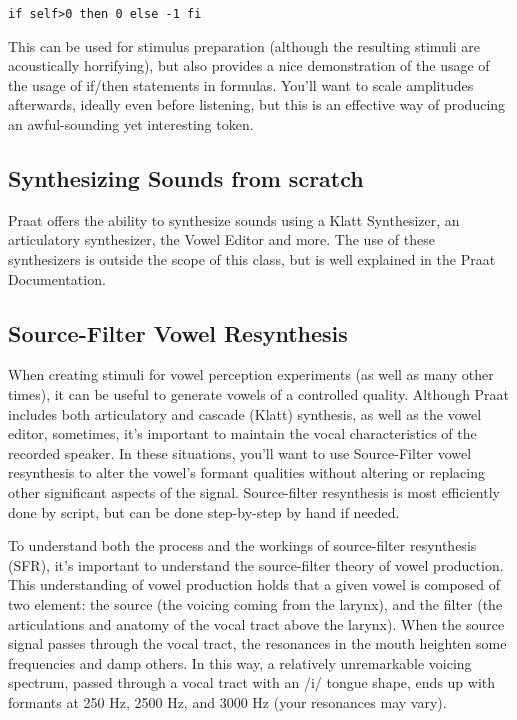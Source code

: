 \documentclass[11pt]{article}
\begin{document}
\texttt{if self>0 then 0 else -1 fi}

This can be used for stimulus preparation (although the resulting
stimuli are acoustically horrifying), but also provides a nice
demonstration of the usage of the usage of if/then statements in
formulas. You'll want to scale amplitudes afterwards, ideally even
before listening, but this is an effective way of producing an
awful-sounding yet interesting token.

\hypertarget{synthesizing-sounds-from-scratch}{%
\subsection{Synthesizing Sounds from
scratch}\label{synthesizing-sounds-from-scratch}}

Praat offers the ability to synthesize sounds using a Klatt Synthesizer,
an articulatory synthesizer, the Vowel Editor and more. The use of these
synthesizers is outside the scope of this class, but is well explained
in the Praat Documentation.

\hypertarget{source-filter-vowel-resynthesis}{%
\subsection{Source-Filter Vowel
Resynthesis}\label{source-filter-vowel-resynthesis}}

When creating stimuli for vowel perception experiments (as well as many
other times), it can be useful to generate vowels of a controlled
quality. Although Praat includes both articulatory and cascade (Klatt)
synthesis, as well as the vowel editor, sometimes, it's important to
maintain the vocal characteristics of the recorded speaker. In these
situations, you'll want to use Source-Filter vowel resynthesis to alter
the vowel's formant qualities without altering or replacing other
significant aspects of the signal. Source-filter resynthesis is most
efficiently done by script, but can be done step-by-step by hand if
needed.

To understand both the process and the workings of source-filter
resynthesis (SFR), it's important to understand the source-filter theory
of vowel production. This understanding of vowel production holds that a
given vowel is composed of two element: the source (the voicing coming
from the larynx), and the filter (the articulations and anatomy of the
vocal tract above the larynx). When the source signal passes through the
vocal tract, the resonances in the mouth heighten some frequencies and
damp others. In this way, a relatively unremarkable voicing spectrum,
passed through a vocal tract with an /i/ tongue shape, ends up with
formants at 250 Hz, 2500 Hz, and 3000 Hz (your resonances may vary).
\end{document}
